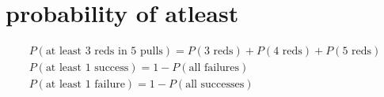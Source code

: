 \documentclass[a4paper,12pt]{article}
\begin{document}
\section{probability of atleast}
\label{sec:orga8785a9}
\begin{my_example}
\begin{gather*}
  P(\text{at least 3 reds in 5 pulls}) = P(\text{3 reds}) + P(\text{4 reds}) + P(\text{5 reds})\\
  P(\text{at least 1 success}) = 1 - P(\text{all failures})\\
  P(\text{at least 1 failure}) = 1 - P(\text{all successes})
\end{gather*}
\end{my_example}
\end{document}
